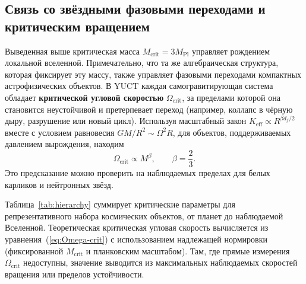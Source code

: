 \documentclass[11pt,a4paper]{article}
\newcommand{\Keff}{K_{\mathrm{eff}}}
\begin{document}
	\subsection{Связь со звёздными фазовыми переходами и критическим вращением}
	
	Выведенная выше критическая масса \(M_{\mathrm{crit}} = 3M_{\mathrm{Pl}}\) управляет рождением локальной вселенной. Примечательно, что та же алгебраическая структура, которая фиксирует эту массу, также управляет фазовыми переходами компактных астрофизических объектов. В YUCT каждая самогравитирующая система обладает \textbf{критической угловой скоростью} \(\Omega_{\mathrm{crit}}\), за пределами которой она становится неустойчивой и претерпевает переход (например, коллапс в чёрную дыру, разрушение или новый цикл). Используя масштабный закон \(\Keff \propto R^{\beta d_f/2}\) вместе с условием равновесия \(GM/R^2 \sim \Omega^2 R\), для объектов, поддерживаемых давлением вырождения, находим
	\begin{equation}
		\Omega_{\mathrm{crit}} \propto M^{\beta}, \qquad \beta = \frac{2}{3}.
		\label{eq:Omega-crit}
	\end{equation}
	Это предсказание можно проверить на наблюдаемых пределах для белых карликов и нейтронных звёзд.
	
	Таблица~\ref{tab:hierarchy} суммирует критические параметры для репрезентативного набора космических объектов, от планет до наблюдаемой Вселенной. Теоретическая критическая угловая скорость вычисляется из уравнения~(\ref{eq:Omega-crit}) с использованием надлежащей нормировки (фиксированной \(M_{\mathrm{crit}}\) и планковским масштабом). Там, где прямые измерения \(\Omega_{\mathrm{crit}}\) недоступны, значение выводится из максимальных наблюдаемых скоростей вращения или пределов устойчивости.
	
\end{document}
